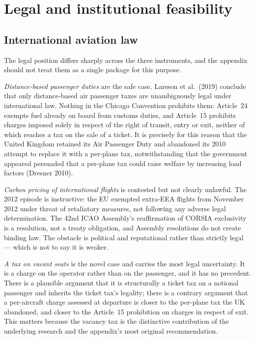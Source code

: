\documentclass[11pt]{article}
\begin{document}
\section{Legal and institutional feasibility}
\label{sec:legal}

\subsection{International aviation law}

The legal position differs sharply across the three instruments, and the
appendix should not treat them as a single package for this purpose.

\emph{Distance-based passenger duties} are the safe case. Larsson et al.\ (2019)
conclude that only distance-based air passenger taxes are unambiguously legal
under international law. Nothing in the Chicago Convention prohibits them:
Article~24 exempts fuel already on board from customs duties, and Article~15
prohibits charges imposed solely in respect of the right of transit, entry or
exit, neither of which reaches a tax on the sale of a ticket. It is precisely for
this reason that the United Kingdom retained its Air Passenger Duty and abandoned
its 2010 attempt to replace it with a per-plane tax, notwithstanding that the
government appeared persuaded that a per-plane tax could raise welfare by
increasing load factors (Dresner 2010).

\emph{Carbon pricing of international flights} is contested but not clearly
unlawful. The 2012 episode is instructive: the EU exempted extra-EEA flights
from November 2012 under threat of retaliatory measures, not following any
adverse legal determination. The 42nd ICAO Assembly's reaffirmation of CORSIA
exclusivity is a resolution, not a treaty obligation, and Assembly resolutions do
not create binding law. The obstacle is political and reputational rather than
strictly legal --- which is not to say it is weaker.

\emph{A tax on vacant seats} is the novel case and carries the most legal
uncertainty. It is a charge on the operator rather than on the passenger, and it
has no precedent. There is a plausible argument that it is structurally a ticket
tax on a notional passenger and inherits the ticket tax's legality; there is a
contrary argument that a per-aircraft charge assessed at departure is closer to
the per-plane tax the UK abandoned, and closer to the Article~15 prohibition on
charges in respect of exit. This matters because the vacancy tax is the
distinctive contribution of the underlying research and the appendix's most
original recommendation.
\end{document}
